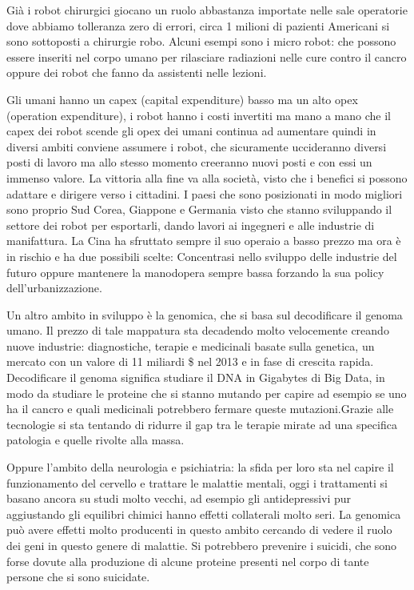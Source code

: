 \documentclass[a4page, 11pt]{article}
\begin{document}
Già i robot chirurgici giocano un ruolo abbastanza importate nelle sale
operatorie dove abbiamo tolleranza zero di errori, circa 1 milioni di
pazienti Americani si sono sottoposti a chirurgie robo. Alcuni esempi
sono i micro robot: che possono essere inseriti nel corpo umano per
rilasciare radiazioni nelle cure contro il cancro oppure dei robot che
fanno da assistenti nelle lezioni.

Gli umani hanno un capex (capital expenditure) basso ma un alto opex
(operation expenditure), i robot hanno i costi invertiti ma mano a mano
che il capex dei robot scende gli opex dei umani continua ad aumentare
quindi in diversi ambiti conviene assumere i robot, che sicuramente
uccideranno diversi posti di lavoro ma allo stesso momento creeranno
nuovi posti e con essi un immenso valore. La vittoria alla fine va alla
società, visto che i benefici si possono adattare e dirigere verso i
cittadini. I paesi che sono posizionati in modo migliori sono proprio
Sud Corea, Giappone e Germania visto che stanno sviluppando il settore
dei robot per esportarli, dando lavori ai ingegneri e alle industrie di
manifattura. La Cina ha sfruttato sempre il suo operaio a basso prezzo
ma ora è in rischio e ha due possibili scelte: Concentrasi nello
sviluppo delle industrie del futuro oppure mantenere la manodopera
sempre bassa forzando la sua policy dell'urbanizzazione.

Un altro ambito in sviluppo è la genomica, che si basa sul decodificare
il genoma umano. Il prezzo di tale mappatura sta decadendo molto
velocemente creando nuove industrie: diagnostiche, terapie e medicinali
basate sulla genetica, un mercato con un valore di 11 miliardi \$ nel
2013 e in fase di crescita rapida. Decodificare il genoma significa
studiare il DNA in Gigabytes di Big Data, in modo da studiare le
proteine che si stanno mutando per capire ad esempio se uno ha il cancro
e quali medicinali potrebbero fermare queste mutazioni.Grazie alle 
tecnologie si sta tentando di ridurre il gap tra le terapie mirate
ad una specifica patologia e quelle rivolte alla massa.

Oppure l'ambito della neurologia e psichiatria: la sfida per loro sta
nel capire il funzionamento del cervello e trattare le malattie mentali,
oggi i trattamenti si basano ancora su studi molto vecchi, ad esempio
gli antidepressivi pur aggiustando gli equilibri chimici hanno effetti
collaterali molto seri. La genomica può avere effetti molto producenti
in questo ambito cercando di vedere il ruolo dei geni in questo genere
di malattie. Si potrebbero prevenire i suicidi, che sono forse dovute
alla produzione di alcune proteine presenti nel corpo di tante persone
che si sono suicidate.
\end{document}

